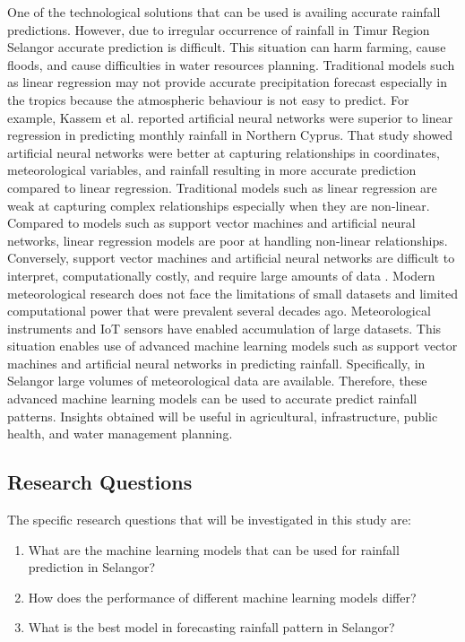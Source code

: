 \documentclass{article}
\begin{document}
One of the technological solutions that can be used is availing accurate rainfall
predictions. However, due to irregular occurrence of rainfall in Timur Region Selangor
accurate prediction is difficult. This situation can harm farming, cause floods, and cause
difficulties in water resources planning. Traditional models such as linear regression may not
provide accurate precipitation forecast especially in the tropics because the atmospheric
behaviour is not easy to predict. For example, Kassem et al. \cite{kassem_et_al_2021} reported artificial neural
networks were superior to linear regression in predicting monthly rainfall in Northern Cyprus.
That study showed artificial neural networks were better at capturing relationships in
coordinates, meteorological variables, and rainfall resulting in more accurate prediction
compared to linear regression. Traditional models such as linear regression are weak at
capturing complex relationships especially when they are non-linear. Compared to models such
as support vector machines and artificial neural networks, linear regression models are poor at
handling non-linear relationships. Conversely, support vector machines and artificial neural
networks are difficult to interpret, computationally costly, and require large amounts of data
\cite{goodfellow_et_al_2023; murphy_2022}. Modern meteorological research does not face the
limitations of small datasets and limited computational power that were prevalent several
decades ago. Meteorological instruments and IoT sensors have enabled accumulation of large
datasets. This situation enables use of advanced machine learning models such as support
vector machines and artificial neural networks in predicting rainfall. Specifically, in Selangor
large volumes of meteorological data are available. Therefore, these advanced machine
learning models can be used to accurate predict rainfall patterns. Insights obtained will be
useful in agricultural, infrastructure, public health, and water management planning.

\subsection{Research Questions}
The specific research questions that will be investigated in this study are:
\begin{enumerate}
    \item What are the machine learning models that can be used for rainfall prediction in
Selangor?
    \item How does the performance of different machine learning models differ?
    \item What is the best model in forecasting rainfall pattern in Selangor?
\end{enumerate}
\end{document}
